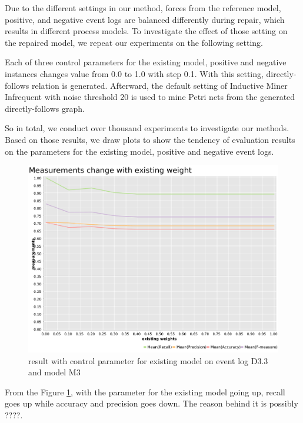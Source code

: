 Due to the different settings in our method, forces from the reference model, positive, and negative event logs are balanced differently during repair, which results in different process models. To investigate the effect of those setting on the repaired model, we repeat our experiments on the following setting. 

Each of three control parameters for the existing model, positive and negative instances changes value from 0.0 to 1.0 with step 0.1. With this setting, directly-follows relation is generated. Afterward, the default setting of Inductive Miner Infrequent with noise threshold 20 is used to mine Petri nets from the generated directly-follows graph. 


So in total, we conduct over thousand experiments to investigate our methods. Based on those results, we draw plots to show the tendency of evaluation results on the parameters for the existing model, positive and negative event logs. 

\begin{figure}
	\includegraphics[width=\linewidth]{figures/evaluation/M3-D43-ext-weight-plot.pdf}
	\caption{result with control parameter for existing model on event log D3.3 and model M3}
	\label{fig:ext-weight}
\end{figure} 
From the Figure \ref{fig:ext-weight}, with the parameter for the existing model going up, recall goes up while accuracy and precision goes down. The reason behind it is possibly ????.


